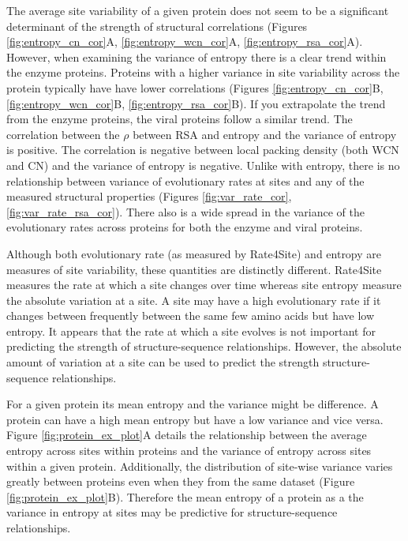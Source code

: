 \documentclass[12pt]{article}
\begin{document}
\indent  The average site variability of a given protein does not seem to be a significant determinant of the strength of structural correlations (Figures \ref{fig:entropy_cn_cor}A, \ref{fig:entropy_wcn_cor}A, \ref{fig:entropy_rsa_cor}A). However, when examining the variance of entropy there is a clear trend within the enzyme proteins.  Proteins with a higher variance in site variability across the protein typically have have lower correlations (Figures \ref{fig:entropy_cn_cor}B, \ref{fig:entropy_wcn_cor}B, \ref{fig:entropy_rsa_cor}B). If you extrapolate the trend from the enzyme proteins, the viral proteins follow a similar trend. The correlation between the $\rho$ between RSA and entropy and the variance of entropy is positive. The correlation is negative between local packing density (both WCN and CN) and the variance of entropy is negative. Unlike with entropy, there is no relationship between variance of evolutionary rates at sites and any of the measured structural properties (Figures \ref{fig:var_rate_cor}, \ref{fig:var_rate_rsa_cor}). There also is a wide spread in the variance of the evolutionary rates across proteins for both the enzyme and viral proteins. 

\indent Although both evolutionary rate (as measured by Rate4Site) and entropy are measures of site variability, these quantities are distinctly different. Rate4Site measures the rate at which a site changes over time whereas site entropy measure the absolute variation at a site. A site may have a high evolutionary rate if it changes between frequently between the same few amino acids but have low entropy. It appears that the rate at which a site evolves is not important for predicting the strength of structure-sequence relationships. However, the absolute amount of variation at a site can be used to predict the strength structure-sequence relationships. 

\indent For a given protein its mean entropy and the variance might be difference. A protein can have a high mean entropy but have a low variance and vice versa. Figure \ref{fig:protein_ex_plot}A details the relationship between the average entropy across sites within proteins and the variance of entropy across sites within a given protein. Additionally, the distribution of site-wise variance varies greatly between proteins even when they from the same dataset (Figure \ref{fig:protein_ex_plot}B). Therefore the mean entropy of a protein as a the variance in entropy at sites may be predictive for structure-sequence relationships.
\end{document}
